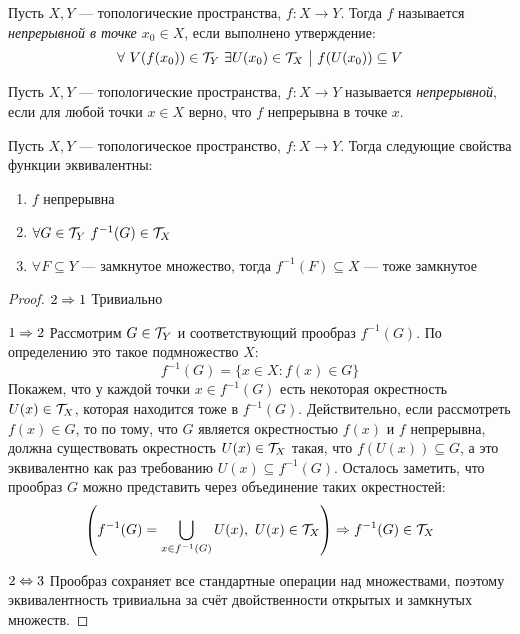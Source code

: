 \begin{definition}
	Пусть $X, Y$ --- топологические пространства, $f \colon X \to Y$. Тогда $f$ называется \textit{непрерывной в точке $x_0 \in X$}, если выполнено утверждение:
	\[
		\forall\ V(f(x_0)) \in \Tau_Y\ \exists U(x_0) \in \Tau_X \such f(U(x_0)) \subseteq V
	\]
\end{definition}

\begin{definition}
	Пусть $X, Y$ --- топологические пространства, $f \colon X \to Y$ называется \textit{непрерывной}, если для любой точки $x \in X$ верно, что $f$ непрерывна в точке $x$.
\end{definition}

\begin{theorem}
	Пусть $X, Y$ --- топологическое пространство, $f \colon X \to Y$. Тогда следующие свойства функции эквивалентны:
	\begin{enumerate}
		\item $f$ непрерывна
		
		\item $\forall G \in \mathcal{T}_Y\ f^{-1}(G) \in \mathcal{T}_X$
		
		\item $\forall F \subseteq Y$ --- замкнутое множество, тогда $f^{-1}(F) \subseteq X$ --- тоже замкнутое
	\end{enumerate}
\end{theorem}

\begin{proof}
	\item $2 \Rightarrow 1$ Тривиально
	
	\item $1 \Rightarrow 2$ Рассмотрим $G \in \mathcal{T}_Y$ и соответствующий прообраз $f^{-1}(G)$. По определению это такое подмножество $X$:
	\[
		f^{-1}(G) = \{x \in X \colon f(x) \in G\}
	\]
	Покажем, что у каждой точки $x \in f^{-1}(G)$ есть некоторая окрестность $U(x) \in \mathcal{T}_X$, которая находится тоже в $f^{-1}(G)$. Действительно, если рассмотреть $f(x) \in G$, то по тому, что $G$ является окрестностью $f(x)$ и $f$ непрерывна, должна существовать окрестность $U(x) \in \mathcal{T}_X$ такая, что $f(U(x)) \subseteq G$, а это эквивалентно как раз требованию $U(x) \subseteq f^{-1}(G)$. Осталось заметить, что прообраз $G$ можно представить через объединение таких окрестностей:
	\[
		\ps{f^{-1}(G) = \bigcup_{x \in f^{-1}(G)} U(x),\ U(x) \in \Tau_X} \Ra f^{-1}(G) \in \Tau_X
	\]
	
	\item $2 \Leftrightarrow 3$ Прообраз сохраняет все стандартные операции над множествами, поэтому эквивалентность тривиальна за счёт двойственности открытых и замкнутых множеств.
\end{proof}